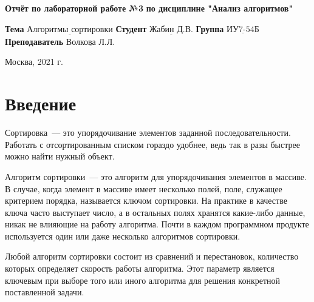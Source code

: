 \documentclass[12pt, a4paper]{report}
\begin{document}
\begin{titlepage}
	
	\begin{center}
		\noindent
			\LARGE\textbf{Отчёт по лабораторной работе №3}\newline
			\textbf{по дисциплине "Анализ алгоритмов"}\newline\newline
	\end{center}
	
	\large\noindent\textbf{Тема} $\underline{\text{Алгоритмы сортировки}}$\newline\newline
	\noindent\textbf{Студент} $\underline{\text{Жабин Д.В.}}$\newline\newline
	\noindent\textbf{Группа} $\underline{\text{ИУ7-54Б}}$\newline\newline
	\noindent\textbf{Преподаватель} $\underline{\text{Волкова Л.Л.}}$\newline\newline\newline
	
	\begin{center}
		\large\vfill
		Москва, 2021 г.
	\end{center}
\end{titlepage}

\setlength{\parindent}{1.25cm}

\setcounter{page}{2}\large\linespread{1.3}\tableofcontents

\newpage
\chapter*{Введение}

Сортировка~--- это упорядочивание элементов заданной последовательности. Работать с отсортированным списком гораздо удобнее, ведь так в разы быстрее можно найти нужный объект.

Алгоритм сортировки~--- это алгоритм для упорядочивания элементов в массиве. В случае, когда элемент в массиве имеет несколько полей, поле, служащее критерием порядка, называется ключом сортировки. На практике в качестве ключа часто выступает число, а в остальных полях хранятся какие-либо данные, никак не влияющие на работу алгоритма. Почти в каждом программном продукте используется один или даже несколько алгоритмов сортировки. 

Любой алгоритм сортировки состоит из сравнений и перестановок, количество которых определяет скорость работы алгоритма. Этот параметр является ключевым при выборе того или иного алгоритма для решения конкретной поставленной задачи.
\end{document}
